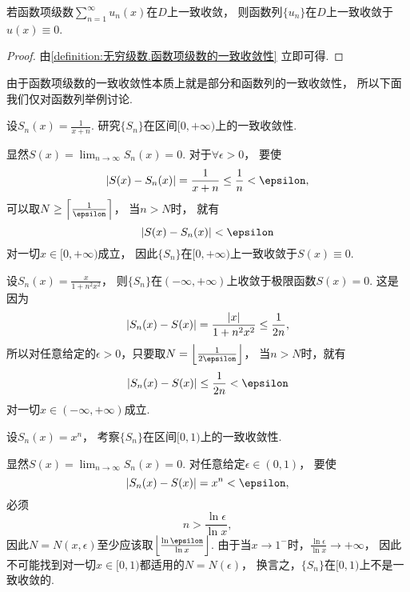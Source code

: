 \begin{proposition}
若函数项级数\(\sum_{n=1}^\infty u_n(x)\)在\(D\)上一致收敛，
则函数列\(\{u_n\}\)在\(D\)上一致收敛于\(u(x) \equiv 0\).
\begin{proof}
由\cref{definition:无穷级数.函数项级数的一致收敛性} 立即可得.
\end{proof}
\end{proposition}

由于函数项级数的一致收敛性本质上就是部分和函数列的一致收敛性，
所以下面我们仅对函数列举例讨论.

\begin{example}
设\(S_n(x) = \frac1{x+n}\).
研究\(\{S_n\}\)在区间\([0,+\infty)\)上的一致收敛性.
\begin{solution}
显然\(S(x) = \lim_{n\to\infty} S_n(x) = 0\).
对于\(\forall\epsilon>0\)，
要使\[
	\abs{S(x) - S_n(x)}
	= \frac1{x+n}
	\leq \frac1{n}
	< \epsilon,
\]
可以取\(N \geq \ceil*{\frac1{\epsilon}}\)，
当\(n>N\)时，
就有\[
	\abs{S(x) - S_n(x)}
	< \epsilon
\]对一切\(x\in[0,+\infty)\)成立，
因此\(\{S_n\}\)在\([0,+\infty)\)上一致收敛于\(S(x)\equiv0\).
\end{solution}
\end{example}

\begin{example}
设\(S_n(x) = \frac{x}{1+n^2x^2}\)，
则\(\{S_n\}\)在\((-\infty,+\infty)\)上收敛于极限函数\(S(x) = 0\).
这是因为\[
	\abs{S_n(x) - S(x)}
	= \frac{\abs{x}}{1+n^2x^2}
	\leq \frac1{2n},
\]
所以对任意给定的\(\epsilon>0\)，只要取\(N = \floor*{\frac1{2\epsilon}}\)，
当\(n>N\)时，就有\[
	\abs{S_n(x) - S(x)} \leq \frac1{2n} < \epsilon
\]对一切\(x\in(-\infty,+\infty)\)成立.
\end{example}

\begin{example}\label{example:函数项级数.不一致收敛的函数列}
设\(S_n(x) = x^n\)，
考察\(\{S_n\}\)在区间\([0,1)\)上的一致收敛性.
\begin{solution}
显然\(S(x) = \lim_{n\to\infty} S_n(x) = 0\).
对任意给定\(\epsilon\in(0,1)\)，
要使\[
	\abs{S_n(x) - S(x)} = x^n < \epsilon,
\]
必须\[
	n > \frac{\ln\epsilon}{\ln x},
\]
因此\(N = N(x,\epsilon)\)至少应该取\(\floor*{\frac{\ln\epsilon}{\ln x}}\).
由于当\(x\to1^-\)时，\(\frac{\ln\epsilon}{\ln x}\to+\infty\)，
因此不可能找到对一切\(x\in[0,1)\)都适用的\(N = N(\epsilon)\)，
换言之，\(\{S_n\}\)在\([0,1)\)上不是一致收敛的.
\end{solution}
\end{example}

